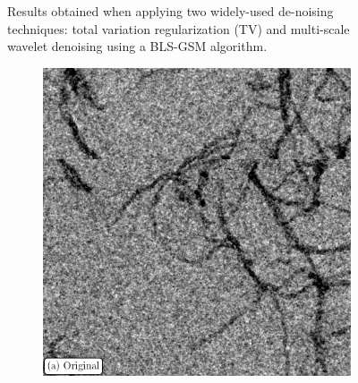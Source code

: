 \begin{figure}[!h]
\begin{subfigure}{0.325\linewidth}
  \end{subfigure}
  \caption{
    Results obtained when applying two widely-used de-noising techniques: total variation regularization (TV) and multi-scale wavelet denoising using a BLS-GSM algorithm.}
\label{fig:fig3}
\end{figure}

\begin{figure}[!h]
  \begin{subfigure}{0.32\textwidth}
    \noindent\includegraphics[width=\textwidth]{Figures/chapter-temsaxs/pectin_crop_tile01_500x500_900_1900_label.png}\label{fig:denoise_comparison_pectin_original}
  \end{subfigure}
  \begin{subfigure}{0.32\textwidth}

\end{subfigure}
\end{figure}
